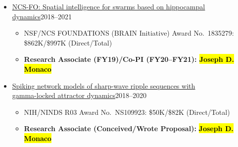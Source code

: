 \documentclass[10pt]{article}
\newcommand{\itemtitle}[1]{{\color{hopkinsblue}\ul{#1}}}
\newcommand{\itemnote}[1]{
  \begin{description}
    \item[$\rightarrow$] \hspace{.09in}{\color{darkgray}\it #1}
  \end{description}
}
\newcommand{\joehl}[1]{\hl{\textbf{#1}}}
\begin{document}

\begin{itemize}
  \item \href{https://www.nsf.gov/awardsearch/showAward?AWD_ID=1835279&HistoricalAwards=false}
    {\itemtitle{NCS-FO: Spatial intelligence for swarms based on hippocampal
    dynamics}}2018--2021
    \begin{itemize}
      \item NSF\slash NCS FOUNDATIONS (BRAIN Initiative) Award No.~1835279: \$862K/\$997K (Direct/Total)
      \item \textbf{Research Associate (FY19)/Co-PI (FY20--FY21): \joehl{Joseph D. Monaco}}
    \end{itemize}
\end{itemize}

\begin{itemize}
  \item \href{https://projectreporter.nih.gov/project_info_description.cfm?aid=9652210&icde=42555668&ddparam=&ddvalue=&ddsub=&cr=2&csb=default&cs=ASC&pball=}
    {\itemtitle{Spiking network models of sharp-wave ripple sequences with\\
    gamma-locked attractor dynamics}}2018--2020
    \begin{itemize}
      \item NIH/NINDS R03 Award No.~NS109923: \$50K/\$82K (Direct/Total)
      \item \textbf{Research Associate (Conceived/Wrote Proposal):} \joehl{Joseph D. Monaco}
    \end{itemize}
\end{itemize}
\end{document}
